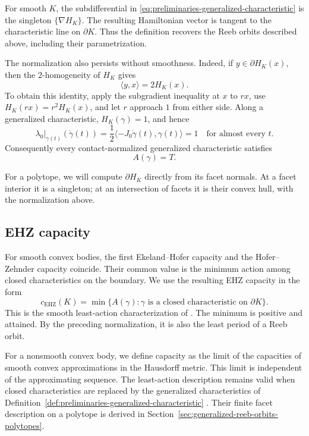 For smooth \(K\), the subdifferential in
\eqref{eq:preliminaries-generalized-characteristic} is the singleton
\(\{\nabla H_K\}\).  The resulting Hamiltonian vector is tangent to the
characteristic line on \(\partial K\).  Thus the definition recovers the Reeb
orbits described above, including their parametrization.

The normalization also persists without smoothness. Indeed, if
\(y\in\partial H_K(x)\), then the \(2\)-homogeneity of \(H_K\) gives
\[
  \langle y,x\rangle=2H_K(x).
\]
To obtain this identity, apply the subgradient inequality at $x$ to $rx$,
use $H_K(rx)=r^2H_K(x)$, and let $r$ approach $1$ from either side.
Along a generalized characteristic, \(H_K(\gamma)=1\), and hence
\[
  \lambda_0|_{\gamma(t)}(\dot\gamma(t))
  =\frac12\langle-J_0\dot\gamma(t),\gamma(t)\rangle
  =1
  \quad\text{for almost every }t.
\]
Consequently every contact-normalized generalized characteristic satisfies
\begin{equation}\label{eq:preliminaries-generalized-characteristic-action-period}
  A(\gamma)=T.
\end{equation}

For a polytope, we will compute $\partial H_K$ directly from its facet
normals. At a facet interior it is a singleton; at an intersection of facets
it is their convex hull, with the normalization above.

\subsection{EHZ capacity}\label{subsec:preliminaries-smooth-symplectic-geometry}

For smooth convex bodies, the first Ekeland--Hofer capacity and the
Hofer--Zehnder capacity
coincide. Their common value is the minimum action among closed
characteristics on the boundary. We use the resulting EHZ capacity in
the form
\begin{equation}\label{eq:preliminaries-ehz-capacity}
  c_{\mathrm{EHZ}}(K)
  = \min\{A(\gamma):\gamma
    \text{ is a closed characteristic on }\partial K\}.
\end{equation}
This is the smooth least-action characterization of
\cite[Theorem~2.2]{AAO2014}.
The minimum is positive and attained. By the preceding normalization,
it is also the least period of a Reeb orbit.

For a nonsmooth convex body, we define capacity as the limit of the
capacities of smooth convex approximations in the Hausdorff metric. This
limit is independent of the approximating sequence. The least-action
description remains valid when closed characteristics are replaced by the
generalized characteristics of
Definition~\ref{def:preliminaries-generalized-characteristic}
\cite[Proposition~2.7]{AAO2014}. Their finite
facet description on a polytope is derived in
Section~\ref{sec:generalized-reeb-orbits-polytopes}.

